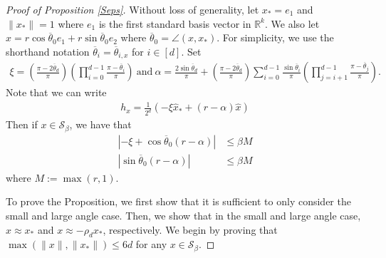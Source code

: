 \documentclass[11pt]{article}
\newcommand{\R}{\mathbb{R}}
\newcommand{\al}{\alpha}
\newcommand{\Seps}{\mathcal{S}}
\theoremstyle{remark}
\begin{document}
\begin{proof}[Proof of Proposition \ref{Seps}]
Without loss of generality, let $x_* = e_1$ and $\|x_*\| = 1$ where $e_1$ is the first standard basis vector in $\R^{k}$. We also let $x = r\cos \overline{\theta}_0 e_1 + r\sin \overline{\theta}_0 e_2$ where $\overline{\theta}_0 = \angle(x,x_*)$. For simplicity, we use the shorthand notation $\overline{\theta}_{i} = \overline{\theta}_{i,x}$ for $i \in [d]$. Set \begin{align*}
\xi = \left(\frac{\pi - 2\overline{\theta}_d}{\pi}\right)\left(\prod_{i=0}^{d-1}\frac{\pi - \overline{\theta}_i}{\pi}\right)\ \text{and}\ \al = \frac{2\sin \overline{\theta}_d}{\pi} + \left(\frac{\pi - 2\overline{\theta}_d}{\pi}\right) \sum_{i=0}^{d-1} \frac{\sin \overline{\theta}_i}{\pi}\left(\prod_{j=i+1}^{d-1} \frac{\pi - \overline{\theta}_j}{\pi}\right).
\end{align*} Note that we can write \begin{align*}
h_{x} = \frac{1}{2^d}\left(-\xi \hat{x}_* + (r - \al)\hat{x}\right)
\end{align*} Then if $x \in \Seps_{\beta}$, we have that \begin{align}
|-\xi + \cos \overline{\theta}_0 (r - \al)| & \leqslant \beta M \label{cosleqM} \\
|\sin \overline{\theta}_0(r - \al)| & \leqslant \beta M \label{sinleqM}
\end{align} where $M:=\max(r,1)$.

To prove the Proposition, we first show that it is sufficient to only consider the small and large angle case. Then, we show that in the small and large angle case, $x \approx x_*$ and $x \approx -\rho_d x_*$, respectively. We begin by proving that $\max(\|x\|,\|x_*\|) \leqslant 6d$ for any $x \in \Seps_{\beta}$.


\end{proof}
\end{document}
